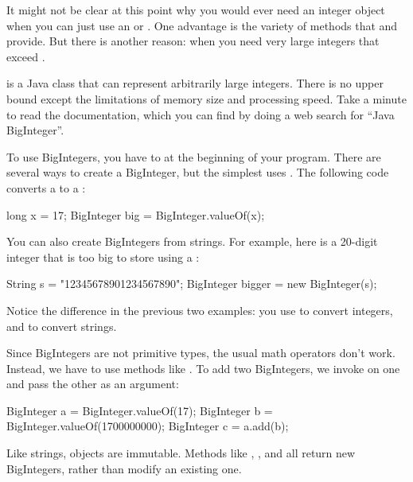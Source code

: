 It might not be clear at this point why you would ever need an integer object when you can just use an  or .
One advantage is the variety of methods that  and  provide.
But there is another reason: when you need very large integers that exceed .


 is a Java class that can represent arbitrarily large integers.
There is no upper bound except the limitations of memory size and processing speed.
Take a minute to read the documentation, which you can find by doing a web search for ``Java BigInteger''.



To use BigIntegers, you have to  at the beginning of your program.
There are several ways to create a BigInteger, but the simplest uses .
The following code converts a  to a :

\begin{code}
long x = 17;
BigInteger big = BigInteger.valueOf(x);
\end{code}

You can also create BigIntegers from strings.
For example, here is a 20-digit integer that is too big to store using a :

\begin{code}
String s = "12345678901234567890";
BigInteger bigger = new BigInteger(s);
\end{code}

Notice the difference in the previous two examples: you use  to convert integers, and  to convert strings.

Since BigIntegers are not primitive types, the usual math operators don't work.
Instead, we have to use methods like .
To add two BigIntegers, we invoke  on one and pass the other as an argument:

\begin{code}
BigInteger a = BigInteger.valueOf(17);
BigInteger b = BigInteger.valueOf(1700000000);
BigInteger c = a.add(b);
\end{code}

Like strings,  objects are immutable.
Methods like , , and  all return new BigIntegers, rather than modify an existing one.

